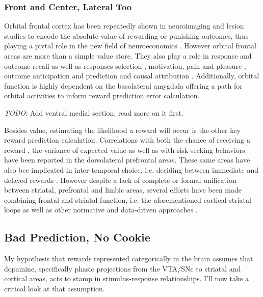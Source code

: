 \documentclass[doc,12pt]{apa}        %
\begin{document}
\subsubsection{Front and Center, Lateral Too}
\label{sub:f_and_c}
Orbital frontal cortex has been repeatedly shown in neuroimaging \cite{ODoherty:2001p2423} and lesion \cite{Hornak:2004p6234} studies to encode the absolute value of rewarding or punishing outcomes, thus playing a pivtal role in the new field of neuroeconomics \cite{Glimcher:2005p863}.  However orbital frontal areas are more than a simple value store.  They also play a role in response and outcome recall as well as responses selection \cite{Rudebeck:2008p4712, Furuyashiki:2008p1631}, motivation, pain and pleasure \cite{Atlas:2010p7566}, outcome anticipation and prediction \cite{Tanaka:2006fk, Roesch:2007p7182} and causal attribution \cite{Tanaka:2008p3265}.  Additionally, orbital function is highly dependent on the basolateral amygdala \cite{ODoherty:2003p2616} offering a path for orbital activities to inform reward prediction error calculation.  

\emph{TODO}: Add ventral medial section; read more on it first.

Besides value, estimating the likelihood a reward will occur is the other key reward prediction calculation.  Correlations with both the chance of receiving a reward \cite{Tobler:2009p8297}, the variance of expected value \cite{Kahnt:2010p7677} as well as with risk-seeking behaviors \cite{Tobler:2007p1562} have been reported in the dorsolateral prefrontal areas.  These same areas have also bee implicated in inter-temporal choice, i.e. deciding between immediate and delayed rewards \cite{Kim:2009p8304,Kim:2008p2984}.  However despite a lack of complete or formal unification between striatal, prefrontal and limbic areas, several efforts have been made combining frontal and striatal function, i.e. the aforementioned cortical-striatal loops \cite{Frank:2011p8152, Seger:2010p7189, Frank:2001p1996, Ashby:2007p8986} as well as other normative \cite{BarGad:2003p4052, Botvinick:2008p6594} and data-driven approaches \cite{Bogacz:2007p753}.


\subsection{Bad Prediction, No Cookie}
\label{sub:wrong}
My hypothesis that rewards represented categorically in the brain assumes that dopamine, specifically phasic projections from the VTA/SNc to striatal and cortical areas, acts to stamp in stimulus-response relationships.  I'll now take a critical look at that assumption.
\end{document}
